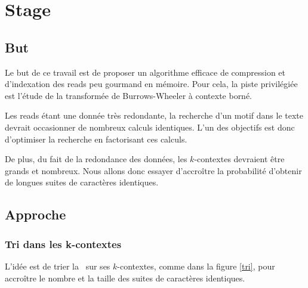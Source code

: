 \section{Stage}

\subsection{But}
Le but de ce travail est de proposer un algorithme efficace de compression et d'indexation des reads peu gourmand en mémoire. Pour cela, la piste privilégiée est l'étude de la transformée de Burrows-Wheeler à contexte borné. 

Les reads étant une donnée très redondante, la recherche d'un motif dans le texte devrait occasionner de nombreux calculs identiques. L'un des objectifs est donc d'optimiser la recherche en factorisant ces calculs. 

De plus, du fait de la redondance des données, les $k$-contextes devraient être grands et nombreux. Nous allons donc essayer d'accroître la probabilité d'obtenir de longues suites de caractères identiques.


\subsection{Approche}

\subsubsection{Tri dans les k-contextes}
L'idée est de trier la \kbwt\ sur ses $k$-contextes, comme dans la figure \ref{tri}, pour accroître le nombre et la taille des suites de caractères identiques.

